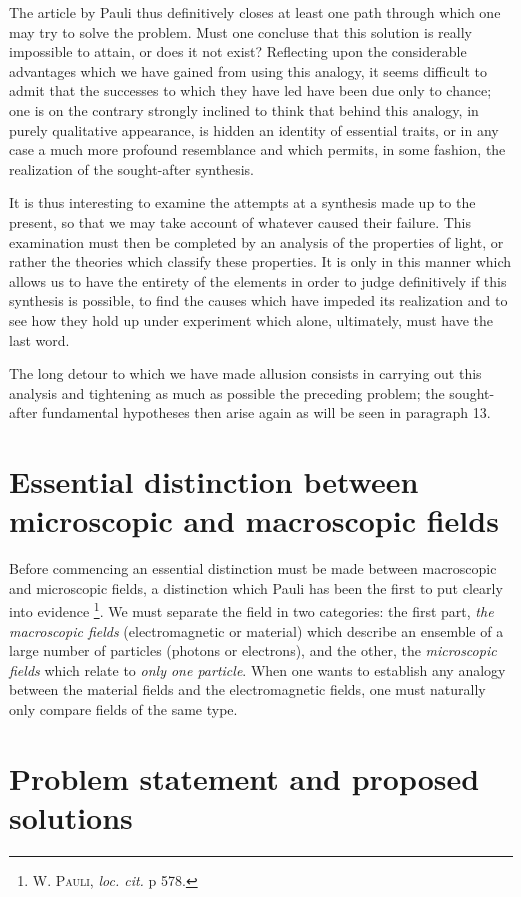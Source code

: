 \documentclass{article}
\renewcommand{\it}[1]{\textit{#1}}
\renewcommand{\sc}[1]{\textsc{#1}}
\begin{document}
\begin{multicols}{2}
The article by Pauli thus definitively closes at least one path through which one may try to solve the problem. Must one concluse that this solution is really impossible to attain, or does it not exist? Reflecting upon the considerable advantages which we have gained from using this analogy, it seems difficult to admit that the successes to which they have led have been due only to chance; one is on the contrary strongly inclined to think that behind this analogy, in purely qualitative appearance, is hidden an identity of essential traits, or in any case a much more profound resemblance and which permits, in some fashion, the realization of the sought-after synthesis.

It is thus interesting to examine the attempts at a synthesis made up to the present, so that we may take account of whatever caused their failure. This examination must then be completed by an analysis of the properties of light, or rather the theories which classify these properties. It is only in this manner which allows us to have the entirety of the elements in order to judge definitively if this synthesis is possible, to find the causes which have impeded its realization and to see how they hold up under experiment which alone, ultimately, must have the last word.

The long detour to which we have made allusion consists in carrying out this analysis and tightening as much as possible the preceding problem; the sought-after fundamental hypotheses then arise again as will be seen in paragraph 13.

\section{Essential distinction between microscopic and macroscopic fields}

Before commencing an essential distinction must be made between macroscopic and microscopic fields, a distinction which Pauli has been the first to put clearly into evidence \footnote{\sc{W. Pauli}, \it{loc. cit.} p 578.}. We must separate the field in two categories: the first part, \it{the macroscopic fields} (electromagnetic or material) which describe an ensemble of a large number of particles (photons or electrons), and the other, the \it{microscopic fields} which relate to \it{only one particle}. When one wants to establish any analogy between the material fields and the electromagnetic fields, one must naturally only compare fields of the same type.

\section{Problem statement and proposed solutions}


\end{multicols}
\end{document}
